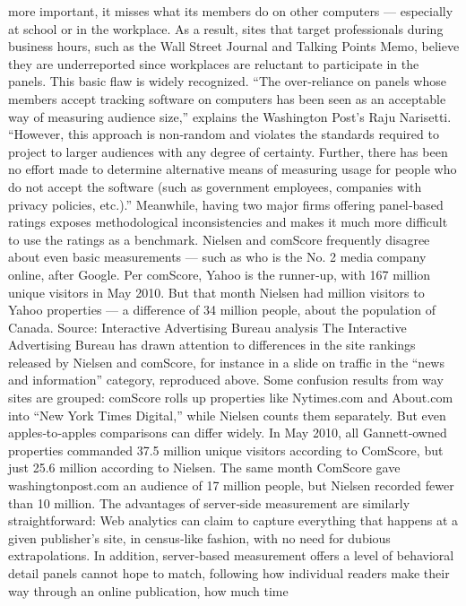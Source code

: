 more important, it misses what its members do on other computers —
especially at school or in the workplace. As a result, sites that target
professionals during business hours, such as the Wall Street Journal and
Talking Points Memo, believe they are underreported since workplaces are
reluctant to participate in the panels.
This basic flaw is widely recognized. ``The over‐reliance on panels whose
members accept tracking software on computers has been seen as an
acceptable way of measuring audience size,'' explains the Washington
Post’s Raju Narisetti. ``However, this approach is non‐random and violates
the standards required to project to larger audiences with any degree of
certainty. Further, there has been no effort made to determine alternative
means of measuring usage for people who do not accept the software
(such as government employees, companies with privacy policies, etc.).''
Meanwhile, having two major firms offering panel‐based ratings exposes
methodological inconsistencies and makes it much more difficult to use
the ratings as a benchmark. Nielsen and comScore frequently disagree
about even basic measurements — such as who is the No. 2 media
company online, after Google. Per comScore, Yahoo is the runner‐up, with
167 million unique visitors in May 2010. But that month Nielsen had
million visitors to Yahoo properties — a difference of 34 million people,
about the population of Canada.
Source: Interactive Advertising Bureau analysis
The Interactive Advertising Bureau has drawn attention to differences in
the site rankings released by Nielsen and comScore, for instance in a slide
on traffic in the ``news and information'' category, reproduced above.
Some confusion results from way sites are grouped: comScore rolls up
properties like Nytimes.com and About.com into ``New York Times
Digital,'' while Nielsen counts them separately. But even apples‐to‐apples
comparisons can differ widely. In May 2010, all Gannett‐owned properties
commanded 37.5 million unique visitors according to ComScore, but just
25.6 million according to Nielsen. The same month ComScore gave
washingtonpost.com an audience of 17 million people, but Nielsen
recorded fewer than 10 million.
The advantages of server‐side measurement are similarly straightforward:
Web analytics can claim to capture everything that happens at a given
publisher’s site, in census‐like fashion, with no need for dubious
extrapolations. In addition, server‐based measurement offers a level of
behavioral detail panels cannot hope to match, following how individual
readers make their way through an online publication, how much time
